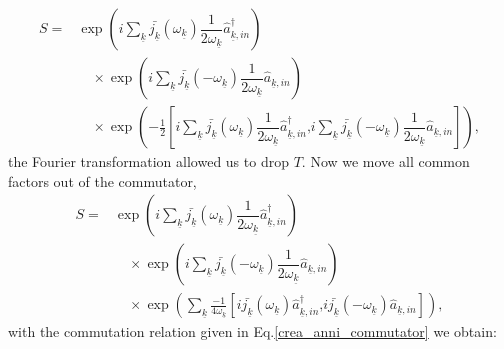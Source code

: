 \documentclass[12pt, titlepage]{article}
\begin{document}
\begin{equation}
\begin{split}
S=
&
 \exp
    \left(
       i
    \sum_{\underline{k}}
    \bar{j_{\underline{k}}}(\omega_{\underline{k}})
     	\dfrac{1}{2\omega_{\underline{k}}}
			\hat{a}^{\dagger}_{\underline{k},in}    
    \right)
	\\
&\quad
 \times
    \exp
    \left(
        i
    \sum_{\underline{k}}
    \bar{j_{\underline{k}}}(-\omega_{\underline{k}})
     	\dfrac{1}{2\omega_{\underline{k}}}
			\hat{a}_{\underline{k},in} 
    \right)    
	\\
&\quad
   \times 
   \exp
    \left(
       -\frac{1}{2}
            	\left[
            	     			i
     	    \sum_{\underline{k}}
     	        \bar{j_{\underline{k}}}(\omega_{\underline{k}})
     	\dfrac{1}{2\omega_{\underline{k}}}
			\hat{a}^{\dagger}_{\underline{k},in} 
     	\textbf{,}
            	i
    \sum_{\underline{k}}
        \bar{j_{\underline{k}}}(-\omega_{\underline{k}})
     	\dfrac{1}{2\omega_{\underline{k}}}
			\hat{a}_{\underline{k},in} 
		\right]  
		\right)      	
	,
\end{split}
\end{equation}
the Fourier transformation allowed us to drop $ T$. Now we move all common factors out of the commutator,
\begin{equation}\label{S_all_3_exp}
\begin{split}
S=
& 
\exp
    \left(
       i
    \sum_{\underline{k}}
    \bar{j_{\underline{k}}}(\omega_{\underline{k}})
     	\dfrac{1}{2\omega_{\underline{k}}}
			\hat{a}^{\dagger}_{\underline{k},in} 
    \right)
	\\
&\quad
 \times
     \exp
    \left(
           i
    \sum_{\underline{k}}
    \bar{j_{\underline{k}}}(-\omega_{\underline{k}})
     	\dfrac{1}{2\omega_{\underline{k}}}
			\hat{a}_{\underline{k},in} 
    \right)    
	\\
&\quad
   \times 
   \exp
    \left(    
    \sum_{\underline{k}}
       \frac{-1}{4\omega_{\underline{k}}}
            	\left[
            	i
            	     	        \bar{j_{\underline{k}}}(\omega_{\underline{k}})
			\hat{a}^{\dagger}_{\underline{k},in} 
     	\textbf{,}
     	i
        \bar{j_{\underline{k}}}(-\omega_{\underline{k}})
			\hat{a}_{\underline{k},in} 
		\right]  
		\right)      	
	,
\end{split}
\end{equation}
with the commutation relation given in Eq.\enskip\eqref{crea_anni_commutator} we obtain:
\end{document}
